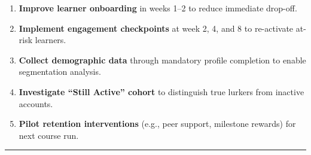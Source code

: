 \documentclass[
]{article}
\providecommand{\tightlist}{%
  \setlength{\itemsep}{0pt}\setlength{\parskip}{0pt}}
\begin{document}
\begin{enumerate}
\def\labelenumi{\arabic{enumi}.}
\tightlist
\item
  \textbf{Improve learner onboarding} in weeks 1--2 to reduce immediate
  drop-off.\\
\item
  \textbf{Implement engagement checkpoints} at week 2, 4, and 8 to
  re-activate at-risk learners.\\
\item
  \textbf{Collect demographic data} through mandatory profile completion
  to enable segmentation analysis.\\
\item
  \textbf{Investigate ``Still Active'' cohort} to distinguish true
  lurkers from inactive accounts.\\
\item
  \textbf{Pilot retention interventions} (e.g., peer support, milestone
  rewards) for next course run.
\end{enumerate}

\begin{center}\rule{0.5\linewidth}{0.5pt}\end{center}
\end{document}
